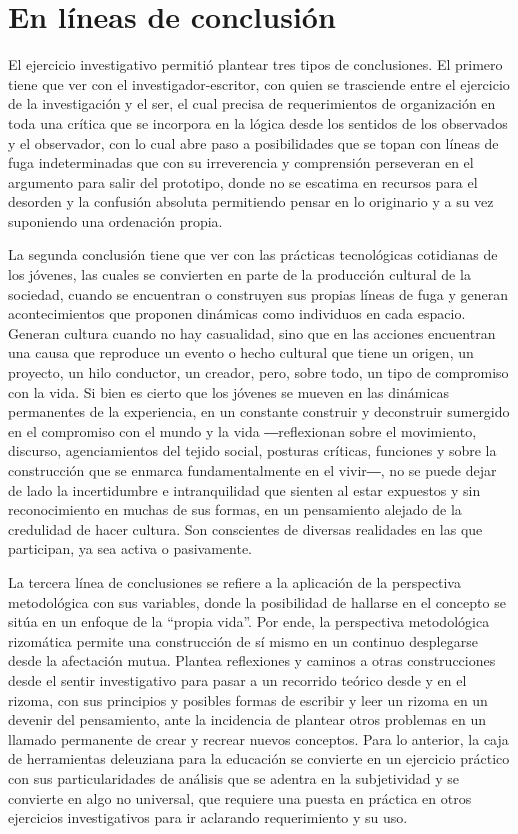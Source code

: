\documentclass[spanish]{textolivre}
\begin{document}
\section{En líneas de conclusión}\label{sec-conclusao}
El ejercicio investigativo permitió plantear tres tipos de conclusiones. El primero tiene que ver con el investigador-escritor, con quien se trasciende entre el ejercicio de la investigación y el ser, el cual precisa de requerimientos de organización en toda una crítica que se incorpora en la lógica desde los sentidos de los observados y el observador, con lo cual abre paso a posibilidades que se topan con líneas de fuga indeterminadas que con su irreverencia y comprensión perseveran en el argumento para salir del prototipo, donde no se escatima en recursos para el desorden y la confusión absoluta permitiendo pensar en lo originario y a su vez suponiendo una ordenación propia.

La segunda conclusión tiene que ver con las prácticas tecnológicas cotidianas de los jóvenes, las cuales se convierten en parte de la producción cultural de la sociedad, cuando se encuentran o construyen sus propias líneas de fuga y generan acontecimientos que proponen dinámicas como individuos en cada espacio. Generan cultura cuando no hay casualidad, sino que en las acciones encuentran una causa que reproduce un evento o hecho cultural que tiene un origen, un proyecto, un hilo conductor, un creador, pero, sobre todo, un tipo de compromiso con la vida. Si bien es cierto que los jóvenes se mueven en las dinámicas permanentes de la experiencia, en un constante construir y deconstruir sumergido en el compromiso con el mundo y la vida ―reflexionan sobre el movimiento, discurso, agenciamientos del tejido social, posturas críticas, funciones y sobre la construcción que se enmarca fundamentalmente en el vivir―, no se puede dejar de lado la incertidumbre e intranquilidad que sienten al estar expuestos y sin reconocimiento en muchas de sus formas, en un pensamiento alejado de la credulidad de hacer cultura. Son conscientes de diversas realidades en las que participan, ya sea activa o pasivamente.

La tercera línea de conclusiones se refiere a la aplicación de la perspectiva metodológica con sus variables, donde la posibilidad de hallarse en el concepto se sitúa en un enfoque de la “propia vida”. Por ende, la perspectiva metodológica rizomática permite una construcción de sí mismo en un continuo desplegarse desde la afectación mutua. Plantea reflexiones y caminos a otras construcciones desde el sentir investigativo para pasar a un recorrido teórico desde y en el rizoma, con sus principios y posibles formas de escribir y leer un rizoma en un devenir del pensamiento, ante la incidencia de plantear otros problemas en un llamado permanente de crear y recrear nuevos conceptos. Para lo anterior, la caja de herramientas deleuziana para la educación se convierte en un ejercicio práctico con sus particularidades de análisis que se adentra en la subjetividad y se convierte en algo no universal, que requiere una puesta en práctica en otros ejercicios investigativos para ir aclarando requerimiento y su uso. 


\printbibliography\label{sec-bib}
\end{document}
